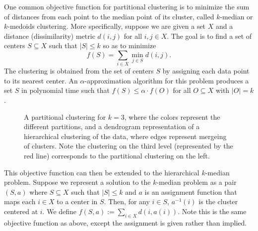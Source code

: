 \documentclass[conference, 10pt, final]{IEEEtran}
\begin{document}
One common objective function for partitional clustering is to minimize the sum of distances from each point to the median point of its cluster, called $k$-median or $k$-medoids clustering. More specifically, suppose we are given a set $X$ and a distance (dissimilarity) metric $d(i,j)$ for all $i,j \in X$. The goal is to find a set of centers $S \subseteq X$ such that $|S| \leq k$ so as to minimize 
\[ f(S) = \sum_{ i\in X} \min_{j \in S} d(i,j). \]
The clustering is obtained from the set of centers $S$ by assigning each data point to its nearest center.  An $\alpha$-approximation algorithm for this problem produces a set $S$ in polynomial time such that $f(S) \leq \alpha \cdot f(O)$ for all $O \subseteq X$ with $|O| = k$. 

\begin{figure}[!]
\centerline{
\hfil
{}}
\caption{A partitional clustering for $k=3$, where the colors represent the different partitions, and a dendrogram representation of a hierarchical clustering of the data, where edges represent mergeing of clusters.  Note the clustering on the third level (represented by the red line) corresponds to the partitional clustering on the left.}
\end{figure}

This objective function can then be extended to the hierarchical $k$-median problem. Suppose we represent a solution to the $k$-median problem as a pair $(S, a)$ where $S \subseteq X$ such that $|S| \leq k$ and $a$ is an assignment function that maps each $i \in X$ to a center in $S$. Then, for any $i \in S$, $a^{-1}(i)$ is the cluster centered at $i$. We define $f(S,a) := \sum_{i \in X} d(i, a(i))$. Note this is the same objective function as above, except the assignment is given rather than implied.
\end{document}
